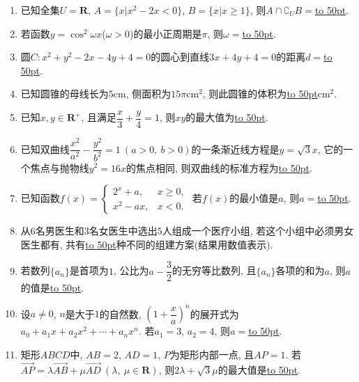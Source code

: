 \documentclass[10pt,a4paper]{article}
\newcommand{\blank}[1]{\underline{\hbox to #1pt{}}}
\begin{document}
\begin{enumerate}[1.]
\begin{center}
\end{center}


\item 已知全集$U=\mathbf{R}$, $A=\{x|x^2-2x<0\}$, $B=\{x|x\ge 1\}$, 则$A\cap \complement_U B=$\blank{50}.
\item 若函数$y=\cos ^2 \omega x$($\omega >0$)的最小正周期是$\pi$, 则$\omega=$\blank{50}.
\item 圆$C:x^2+y^2-2x-4y+4=0$的圆心到直线$3x+4y+4=0$的距离$d=$\blank{50}.
\item 已知圆锥的母线长为$5\text{cm}$, 侧面积为$15 \pi \text{cm}^2$, 则此圆锥的体积为\blank{50}$\text{cm}^2$.
\item 已知$x,y\in \mathbf{R}^+$, 且满足$\dfrac x3+\dfrac y4=1$, 则$xy$的最大值为\blank{50}.
\item 已知双曲线$\dfrac{x^2}{a^2}-\dfrac{y^2}{b^2}=1 \ (a>0,\ b>0)$的一条渐近线方程是$y=\sqrt3x$, 它的一个焦点与抛物线$y^2=16x$的焦点相同, 则双曲线的标准方程为\blank{50}.
\item 已知函数$f(x)=\begin{cases}2^x +a, & x\ge 0, \\ x^2-ax, & x<0.\end{cases}$ 若$f(x)$的最小值是$a$, 则$a=$\blank{50}.
\item 从$6$名男医生和$3$名女医生中选出$5$人组成一个医疗小组, 若这个小组中必须男女医生都有, 共有\blank{50}种不同的组建方案(结果用数值表示).
\item 若数列$\{a_n\}$是首项为$1$, 公比为$a-\dfrac32$的无穷等比数列, 且$\{a_n\}$各项的和为$a$, 则$a$的值是\blank{50}.
\item 设$a\ne 0$, $n$是大于$1$的自然数, $(1+\dfrac xa)^n$的展开式为$a_0+a_1x+a_2x^2+\cdots+a_nx^n$. 若$a_1=3$, $a_2=4$, 则$a=$\blank{50}.
\item 矩形$ABCD$中, $AB=2$, $AD=1$, $P$为矩形内部一点, 且$AP=1$. 若$\overrightarrow{AP}=\lambda \overrightarrow{AB}+\mu \overrightarrow{AD} \ (\lambda,\ \mu \in \mathbf{R})$, 则$2 \lambda +\sqrt3\mu$的最大值是\blank{50}.


\end{enumerate}
\end{document}
